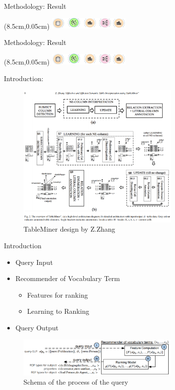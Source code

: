\documentclass{beamer}
\begin{document}
\begin{frame}{Methodology: Result}
	\begin{textblock*}{4cm}(8.5cm,0.05cm) %
		\includegraphics[width=4cm]{images/header.png}
	\end{textblock*}
\end{frame}
\begin{frame}{Methodology: Result}
	\begin{textblock*}{4cm}(8.5cm,0.05cm) %
		\includegraphics[width=4cm]{images/header.png}
	\end{textblock*}
\end{frame}


\begin{frame}{Introduction: }
	\begin{figure}
		\includegraphics[width=8cm]{images/TableMiner.png}
		\caption{\label{fig:your-figure2} TableMiner design by Z.Zhang}
	\end{figure}
\end{frame}



\begin{frame}{Introduction}
	\begin{itemize}
		\item Query Input
		\item Recommender of Vocabulary Term
		      \begin{itemize}
			      \item Features for ranking
			      \item Learning to Ranking
		      \end{itemize}
		\item Query Output
	\end{itemize}
	\begin{figure}
		\includegraphics[width=8cm]{images/schema-queryinput.png}
		\caption{\label{fig:your-figure1}Schema of the process of the query}
	\end{figure}
\end{frame}
\end{document}
